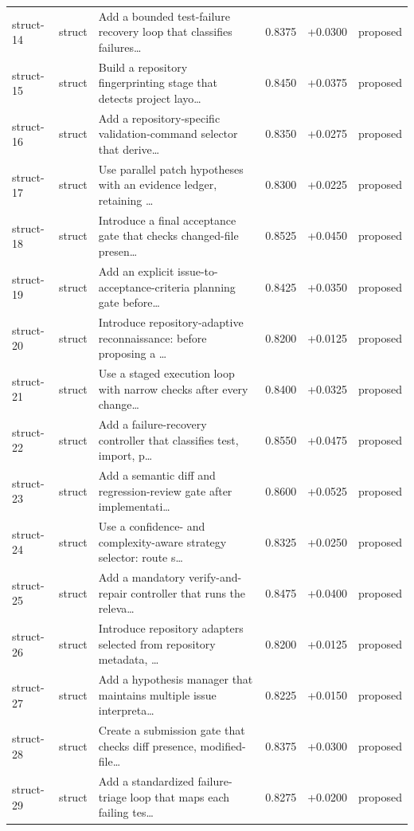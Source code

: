 \begin{center}
\begin{longtable}{llp{5.2cm}rrl}
struct-14 & struct & Add a bounded test-failure recovery loop that classifies failures\ldots{} & 0.8375 & +0.0300 & proposed \\
struct-15 & struct & Build a repository fingerprinting stage that detects project layo\ldots{} & 0.8450 & +0.0375 & proposed \\
struct-16 & struct & Add a repository-specific validation-command selector that derive\ldots{} & 0.8350 & +0.0275 & proposed \\
struct-17 & struct & Use parallel patch hypotheses with an evidence ledger, retaining \ldots{} & 0.8300 & +0.0225 & proposed \\
struct-18 & struct & Introduce a final acceptance gate that checks changed-file presen\ldots{} & 0.8525 & +0.0450 & proposed \\
struct-19 & struct & Add an explicit issue-to-acceptance-criteria planning gate before\ldots{} & 0.8425 & +0.0350 & proposed \\
struct-20 & struct & Introduce repository-adaptive reconnaissance: before proposing a \ldots{} & 0.8200 & +0.0125 & proposed \\
struct-21 & struct & Use a staged execution loop with narrow checks after every change\ldots{} & 0.8400 & +0.0325 & proposed \\
struct-22 & struct & Add a failure-recovery controller that classifies test, import, p\ldots{} & 0.8550 & +0.0475 & proposed \\
struct-23 & struct & Add a semantic diff and regression-review gate after implementati\ldots{} & 0.8600 & +0.0525 & proposed \\
struct-24 & struct & Use a confidence- and complexity-aware strategy selector: route s\ldots{} & 0.8325 & +0.0250 & proposed \\
struct-25 & struct & Add a mandatory verify-and-repair controller that runs the releva\ldots{} & 0.8475 & +0.0400 & proposed \\
struct-26 & struct & Introduce repository adapters selected from repository metadata, \ldots{} & 0.8200 & +0.0125 & proposed \\
struct-27 & struct & Add a hypothesis manager that maintains multiple issue interpreta\ldots{} & 0.8225 & +0.0150 & proposed \\
struct-28 & struct & Create a submission gate that checks diff presence, modified-file\ldots{} & 0.8375 & +0.0300 & proposed \\
struct-29 & struct & Add a standardized failure-triage loop that maps each failing tes\ldots{} & 0.8275 & +0.0200 & proposed \\

\end{longtable}
\end{center}
